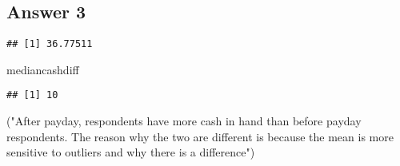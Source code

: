 \documentclass[
]{article}
\newenvironment{Shaded}{\begin{snugshade}}{\end{snugshade}}
\newcommand{\DataTypeTok}[1]{\textcolor[rgb]{0.13,0.29,0.53}{#1}}
\newcommand{\KeywordTok}[1]{\textcolor[rgb]{0.13,0.29,0.53}{\textbf{#1}}}
\newcommand{\NormalTok}[1]{#1}
\newcommand{\OperatorTok}[1]{\textcolor[rgb]{0.81,0.36,0.00}{\textbf{#1}}}
\newcommand{\OtherTok}[1]{\textcolor[rgb]{0.56,0.35,0.01}{#1}}
\newcommand{\StringTok}[1]{\textcolor[rgb]{0.31,0.60,0.02}{#1}}
\begin{document}
\hypertarget{answer-3}{%
\subsection{Answer 3}\label{answer-3}}

\begin{Shaded}
\end{Shaded}

\begin{verbatim}
## [1] 36.77511
\end{verbatim}

\begin{Shaded}
\begin{Highlighting}[]
\NormalTok{mediancashdiff}
\end{Highlighting}
\end{Shaded}

\begin{verbatim}
## [1] 10
\end{verbatim}

\begin{Shaded}
\begin{Highlighting}[]
\NormalTok{(}\StringTok{"After payday, respondents have more cash in hand than before payday respondents. The reason why the two are different is because the mean is more sensitive to outliers and why there is a difference"}\NormalTok{)}
\end{Highlighting}
\end{Shaded}
\end{document}
